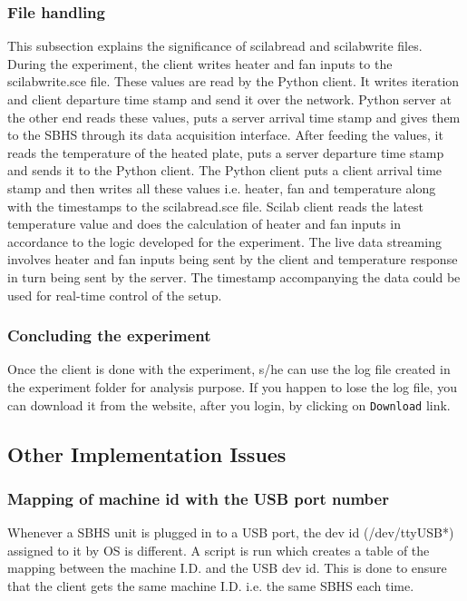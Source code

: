 \subsubsection { File handling} This subsection explains the
significance of scilabread and scilabwrite files. During the
experiment, the client writes heater and fan inputs to the
scilabwrite.sce file. These values are read by the Python client. It writes iteration and client departure time stamp and send it over the network. Python server at the other end reads these values, puts a server arrival time stamp and gives them to the SBHS through its data acquisition
interface. After feeding the values, it reads the temperature of the
heated plate, puts a server departure time stamp and sends it to the Python client. The Python client puts a client arrival time stamp and then writes all these values i.e. heater, fan and temperature along with the
timestamps to the scilabread.sce file. Scilab client reads the latest
temperature value and does the calculation of heater and fan inputs in
accordance to the logic developed for the experiment. The live data
streaming involves heater and fan inputs being sent by the client and
temperature response in turn being sent by the server. The timestamp accompanying the data could be used for real-time
control of the setup.

\subsubsection { Concluding the experiment} Once the client is done
with the experiment, s/he can use the log file created in the experiment folder for analysis purpose. If you happen to lose the log file, you can download it from the website, after you login, by clicking on {\tt Download} link.

\subsection{Other Implementation Issues}
\subsubsection { Mapping of machine id with the USB port number}
Whenever a SBHS unit is plugged in to a USB port, the dev id (/dev/ttyUSB*) assigned to it by OS is different. A script is run which creates a table of the mapping between the machine I.D. and the USB dev id. This is done to ensure that the client gets the same machine I.D. i.e. the same SBHS each time. 

